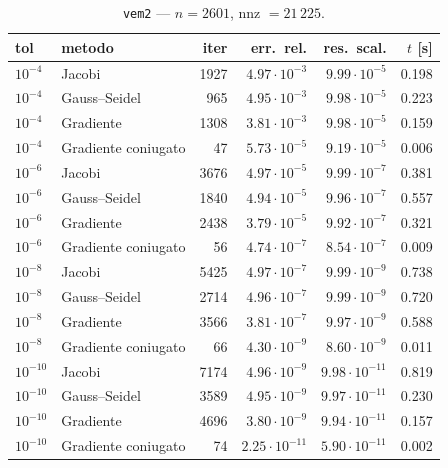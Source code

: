 \documentclass[11pt,a4paper]{article}
\begin{document}
\begin{table}[h]
\centering
\caption{\texttt{vem2} --- $n=2601$, nnz $=21\,225$.}
\begin{tabular}{l l r r r r}
\toprule
tol & metodo & iter & err.\ rel. & res.\ scal. & $t$ [s] \\
\midrule
$10^{-4}$  & Jacobi              & 1927 & $4.97\cdot10^{-3}$ & $9.99\cdot10^{-5}$ & 0.198 \\
$10^{-4}$  & Gauss--Seidel       & 965  & $4.95\cdot10^{-3}$ & $9.98\cdot10^{-5}$ & 0.223 \\
$10^{-4}$  & Gradiente           & 1308 & $3.81\cdot10^{-3}$ & $9.98\cdot10^{-5}$ & 0.159 \\
$10^{-4}$  & Gradiente coniugato & 47   & $5.73\cdot10^{-5}$ & $9.19\cdot10^{-5}$ & 0.006 \\
\midrule
$10^{-6}$  & Jacobi              & 3676 & $4.97\cdot10^{-5}$ & $9.99\cdot10^{-7}$ & 0.381 \\
$10^{-6}$  & Gauss--Seidel       & 1840 & $4.94\cdot10^{-5}$ & $9.96\cdot10^{-7}$ & 0.557 \\
$10^{-6}$  & Gradiente           & 2438 & $3.79\cdot10^{-5}$ & $9.92\cdot10^{-7}$ & 0.321 \\
$10^{-6}$  & Gradiente coniugato & 56   & $4.74\cdot10^{-7}$ & $8.54\cdot10^{-7}$ & 0.009 \\
\midrule
$10^{-8}$  & Jacobi              & 5425 & $4.97\cdot10^{-7}$ & $9.99\cdot10^{-9}$ & 0.738 \\
$10^{-8}$  & Gauss--Seidel       & 2714 & $4.96\cdot10^{-7}$ & $9.99\cdot10^{-9}$ & 0.720 \\
$10^{-8}$  & Gradiente           & 3566 & $3.81\cdot10^{-7}$ & $9.97\cdot10^{-9}$ & 0.588 \\
$10^{-8}$  & Gradiente coniugato & 66   & $4.30\cdot10^{-9}$ & $8.60\cdot10^{-9}$ & 0.011 \\
\midrule
$10^{-10}$ & Jacobi              & 7174 & $4.96\cdot10^{-9}$  & $9.98\cdot10^{-11}$ & 0.819 \\
$10^{-10}$ & Gauss--Seidel       & 3589 & $4.95\cdot10^{-9}$  & $9.97\cdot10^{-11}$ & 0.230 \\
$10^{-10}$ & Gradiente           & 4696 & $3.80\cdot10^{-9}$  & $9.94\cdot10^{-11}$ & 0.157 \\
$10^{-10}$ & Gradiente coniugato & 74   & $2.25\cdot10^{-11}$ & $5.90\cdot10^{-11}$ & 0.002 \\
\bottomrule
\end{tabular}
\end{table}
\end{document}
